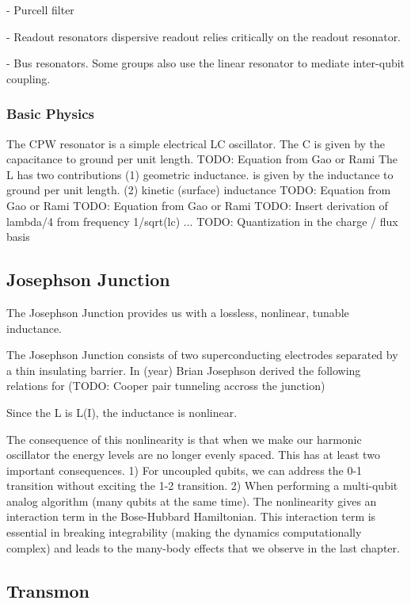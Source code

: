 - Purcell filter

- Readout resonators
dispersive readout relies critically on the readout resonator.

- Bus resonators.
Some groups also use the linear resonator to mediate inter-qubit coupling.

\subsubsection{Basic Physics}
The CPW resonator is a simple electrical LC oscillator.
The C is given by the capacitance to ground per unit length.
TODO:  Equation from Gao or Rami
The L has two contributions
(1) geometric inductance.  is given by the inductance to ground per unit length.
(2) kinetic (surface) inductance
TODO:  Equation from Gao or Rami
TODO:  Equation from Gao or Rami
TODO:  Insert derivation of lambda/4 from frequency 1/sqrt(lc) ...
TODO:  Quantization in the charge / flux basis

\subsection{Josephson Junction}
The Josephson Junction provides us with a lossless, nonlinear, tunable inductance.

The Josephson Junction consists of two superconducting electrodes separated by a thin insulating barrier.
In (year) Brian Josephson derived the following relations for (TODO: Cooper pair tunneling accross the junction)

Since the L is L(I), the inductance is nonlinear.

The consequence of this nonlinearity is that when we make our harmonic oscillator the energy levels are no longer evenly spaced.
This has at least two important consequences.
1) For uncoupled qubits, we can address the 0-1 transition without exciting the 1-2 transition.
2) When performing a multi-qubit analog algorithm (many qubits at the same time).
The nonlinearity gives an interaction term in the Bose-Hubbard Hamiltonian.
This interaction term is essential in breaking integrability (making the dynamics computationally complex) and leads to the many-body effects that we observe in the last chapter.

\subsection{Transmon}

